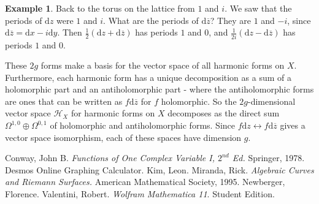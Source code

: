 \documentclass[12pt]{article}
\newcommand{\ita}[1]{\textit{#1}}
\newcommand{\paren}[1]{\left( #1 \right)}
\theoremstyle{definition}
\newtheorem{example}[theorem]{Example}
\theoremstyle{remark}
\begin{document}
\begin{example}
    Back to the torus on the lattice from $1$ and $i$. We saw that the periods of $\mathrm{d}z$ were $1$ and $i$. What are the periods of $\mathrm{d} \overline{z}$? They are $1$ and $-i$, since $\mathrm{d} \overline{z} = \mathrm{d}x - i \mathrm{d}y$. Then $\frac{1}{2} \paren{ \mathrm{d}z + \mathrm{d} \overline{z} }$ has periods $1$ and $0$, and $\frac{1}{2i} \paren{ \mathrm{d}z - \mathrm{d} \overline{z} }$ has periods $1$ and $0$.
\end{example}
These $2g$ forms make a basis for the vector space of all harmonic forms on $X$. Furthermore, each harmonic form has a unique decomposition as a sum of a holomorphic part and an antiholomorphic part - where the antiholomorphic forms are ones that can be written as $f \mathrm{d} \overline{z}$ for $f$ holomorphic. So the $2g$-dimensional vector space $\mathcal{H}_X$ for harmonic forms on $X$ decomposes as the direct sum $\Omega^{1,0} \oplus \Omega^{0,1}$ of holomorphic and antiholomorphic forms. Since $f \mathrm{d}z \leftrightarrow f \mathrm{d} \overline{z}$ gives a vector space isomorphism, each of these spaces have dimension $g$.
\newpage
{}
{}
\begin{thebibliography}{99}
     Conway, John B. \ita{Functions of One Complex Variable I, $2^{nd}$ Ed.} Springer, 1978.
     Desmos Online Graphing Calculator.
     Kim, Leon.
     Miranda, Rick. \ita{Algebraic Curves and Riemann Surfaces.} American Mathematical Society, 1995.
     Newberger, Florence.
     Valentini, Robert.
     \ita{Wolfram Mathematica 11}. Student Edition.
\end{thebibliography}
\end{document}
